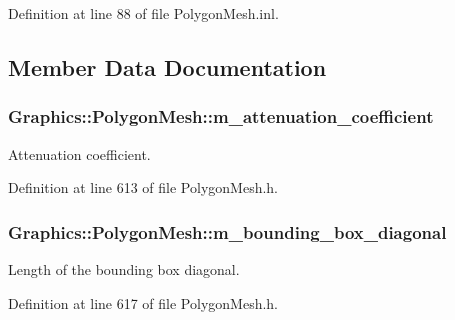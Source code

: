 Definition at line 88 of file PolygonMesh.inl.



\subsection{Member Data Documentation}
\hypertarget{class_graphics_1_1_polygon_mesh_ab1ca7c29c40e562b58ff4915e26724cb}{
\subsubsection[{m\_\-attenuation\_\-coefficient}]{ {\bf Graphics::PolygonMesh::m\_\-attenuation\_\-coefficient}}}
\label{class_graphics_1_1_polygon_mesh_ab1ca7c29c40e562b58ff4915e26724cb}


Attenuation coefficient. 



Definition at line 613 of file PolygonMesh.h.

\hypertarget{class_graphics_1_1_polygon_mesh_aaa93546b5f9f1f9ddb70aaeeb2ed5be8}{
\subsubsection[{m\_\-bounding\_\-box\_\-diagonal}]{ {\bf Graphics::PolygonMesh::m\_\-bounding\_\-box\_\-diagonal}}}
\label{class_graphics_1_1_polygon_mesh_aaa93546b5f9f1f9ddb70aaeeb2ed5be8}


Length of the bounding box diagonal. 



Definition at line 617 of file PolygonMesh.h.

